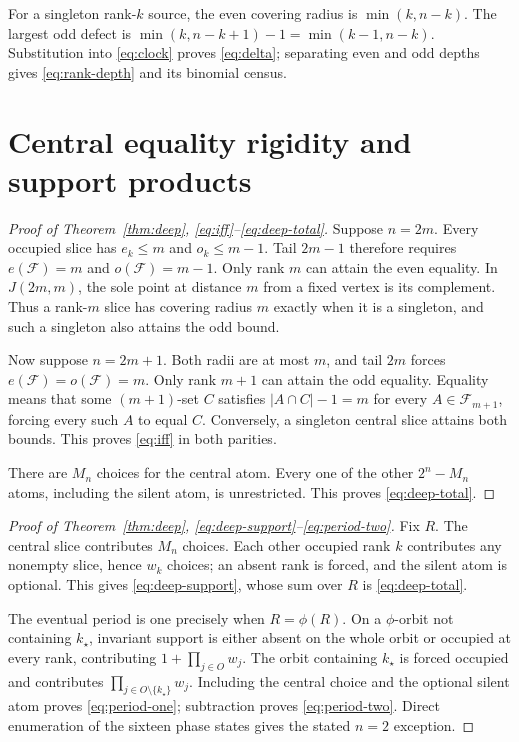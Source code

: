 \documentclass[a4paper,10pt]{amsart}
\newcommand{\cF}{\mathcal F}
\begin{document}
For a singleton rank-$k$ source, the even covering radius is
$\min(k,n-k)$.  The largest odd defect is
$\min(k,n-k+1)-1=\min(k-1,n-k)$.  Substitution into
\eqref{eq:clock} proves \eqref{eq:delta}; separating even and odd depths gives
\eqref{eq:rank-depth} and its binomial census.

\section{Central equality rigidity and support products}

\begin{proof}[Proof of Theorem~\ref{thm:deep},
\eqref{eq:iff}--\eqref{eq:deep-total}]
Suppose $n=2m$.  Every occupied slice has $e_k\leq m$ and $o_k\leq m-1$.
Tail $2m-1$ therefore requires $e(\cF)=m$ and $o(\cF)=m-1$.  Only rank $m$
can attain the even equality.  In $J(2m,m)$, the sole point at distance $m$
from a fixed vertex is its complement.  Thus a rank-$m$ slice has covering
radius $m$ exactly when it is a singleton, and such a singleton also attains
the odd bound.

Now suppose $n=2m+1$.  Both radii are at most $m$, and tail $2m$ forces
$e(\cF)=o(\cF)=m$.  Only rank $m+1$ can attain the odd equality.  Equality
means that some $(m+1)$-set $C$ satisfies $|A\cap C|-1=m$ for every
$A\in\cF_{m+1}$, forcing every such $A$ to equal $C$.  Conversely, a
singleton central slice attains both bounds.  This proves \eqref{eq:iff} in
both parities.

There are $M_n$ choices for the central atom.  Every one of the other
$2^n-M_n$ atoms, including the silent atom, is unrestricted.  This proves
\eqref{eq:deep-total}.
\end{proof}

\begin{proof}[Proof of Theorem~\ref{thm:deep},
\eqref{eq:deep-support}--\eqref{eq:period-two}]
Fix $R$.  The central slice contributes $M_n$ choices.  Each other occupied
rank $k$ contributes any nonempty slice, hence $w_k$ choices; an absent rank
is forced, and the silent atom is optional.  This gives
\eqref{eq:deep-support}, whose sum over $R$ is
\eqref{eq:deep-total}.

The eventual period is one precisely when $R=\phi(R)$.  On a $\phi$-orbit
not containing $k_\star$, invariant support is either absent on the whole
orbit or occupied at every rank, contributing $1+\prod_{j\in O}w_j$.  The
orbit containing $k_\star$ is forced occupied and contributes
$\prod_{j\in O\setminus\{k_\star\}}w_j$.  Including the central choice and
the optional silent atom proves \eqref{eq:period-one}; subtraction proves
\eqref{eq:period-two}.  Direct enumeration of the sixteen phase states gives
the stated $n=2$ exception.
\end{proof}
\end{document}
